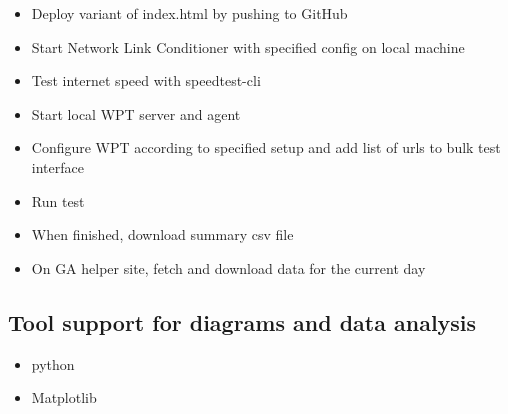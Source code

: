\begin{itemize}
\item Deploy variant of index.html by pushing to GitHub
\item Start Network Link Conditioner with specified config on local machine
\item Test internet speed with speedtest-cli
\item Start local WPT server and agent
\item Configure WPT according to specified setup and add list of urls to bulk test interface
\item Run test
\item When finished, download summary csv file
\item On GA helper site, fetch and download data for the current day
\end{itemize}








\subsection{Tool support for diagrams and data analysis}

\begin{itemize}
\item python
\item Matplotlib
\end{itemize}
